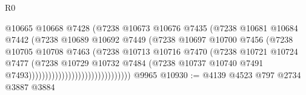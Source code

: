 \begin{lexlean}{R0}
\begin{coremodule}
                                                @10665
                                                @10668
                                                @7428
                                                (@7238
                                                  @10673
                                                  @10676
                                                  @7435
                                                  (@7238
                                                    @10681
                                                    @10684
                                                    @7442
                                                    (@7238
                                                      @10689
                                                      @10692
                                                      @7449
                                                      (@7238
                                                        @10697
                                                        @10700
                                                        @7456
                                                        (@7238
                                                          @10705
                                                          @10708
                                                          @7463
                                                          (@7238
                                                            @10713
                                                            @10716
                                                            @7470
                                                            (@7238
                                                              @10721
                                                              @10724
                                                              @7477
                                                              (@7238
                                                                @10729
                                                                @10732
                                                                @7484
                                                                (@7238
                                                                  @10737
                                                                  @10740
                                                                  @7491
                                                                  @7493)))))))))))))))))))))))))))))))
    @9965
@10930 := @4139 @4523 @797 @2734 @3887 @3884

\end{coremodule}
\end{lexlean}
